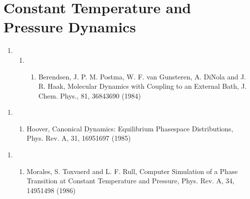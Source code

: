 \documentclass[letterpaper,11pt,english]{sphinxmanual}
\begin{document}
\section{Constant Temperature and Pressure Dynamics}
\label{\detokenize{text/references:constant-temperature-and-pressure-dynamics}}\begin{enumerate}
%
\setcounter{enumi}{7}
\item {} \begin{enumerate}
%
\setcounter{enumii}{9}
\item {} \begin{enumerate}
%
\setcounter{enumiii}{2}
\item {} 
Berendsen, J. P. M. Postma, W. F. van Gunsteren, A. DiNola and J. R. Haak, Molecular Dynamics with Coupling to an External Bath, J. Chem. Phys., 81, 3684\sphinxhyphen{}3690 (1984)

\end{enumerate}

\end{enumerate}

\end{enumerate}
\begin{enumerate}
%
\setcounter{enumi}{22}
\item {} \begin{enumerate}
%
\setcounter{enumii}{6}
\item {} 
Hoover, Canonical Dynamics: Equilibrium Phase\sphinxhyphen{}space Distributions, Phys. Rev. A, 31, 1695\sphinxhyphen{}1697 (1985)

\end{enumerate}

\end{enumerate}
\begin{enumerate}
%
\setcounter{enumi}{9}
\item {} \begin{enumerate}
%
\setcounter{enumii}{9}
\item {} 
Morales, S. Toxvaerd and L. F. Rull, Computer Simulation of a Phase Transition at Constant Temperature and Pressure, Phys. Rev. A, 34, 1495\sphinxhyphen{}1498 (1986)

\end{enumerate}

\end{enumerate}
\end{document}
